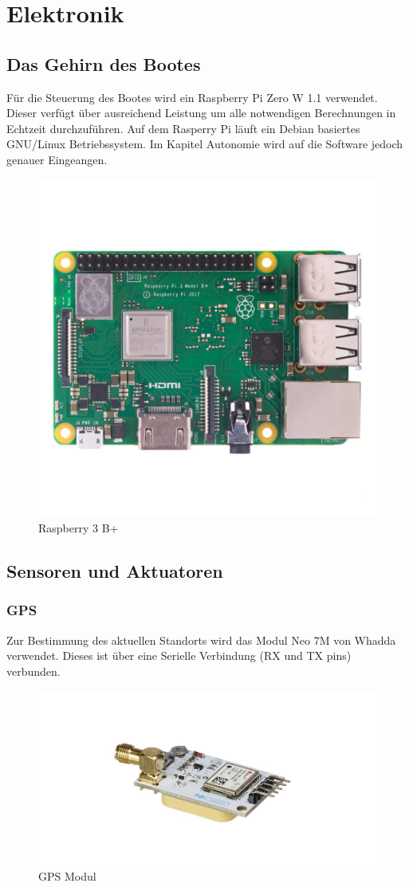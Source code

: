 

\chapter{Elektronik}
\label{chap:elektronik}

\section{Das Gehirn des Bootes}
Für die Steuerung des Bootes wird ein Raspberry Pi Zero W 1.1 verwendet. Dieser verfügt über ausreichend Leistung um alle notwendigen Berechnungen in Echtzeit durchzuführen. Auf dem Rasperry Pi läuft ein Debian basiertes GNU/Linux Betriebssystem. Im Kapitel Autonomie wird auf die Software jedoch genauer Eingeangen.

\begin{figure}[H] 
  \centering
    \includegraphics[width=0.5\linewidth]{PI_3B-plus-1-0.jpg}
    \caption{Raspberry 3 B+}
    \label{fig:rp3b+}
\end{figure}




\section{Sensoren und Aktuatoren}
\subsection{GPS}
Zur Bestimmung des aktuellen Standorts wird das Modul Neo 7M von Whadda verwendet. Dieses ist über eine Serielle Verbindung (RX und TX pins) verbunden.
\begin{figure}[H] 
    \centering
    \includegraphics[width=0.5\linewidth]{gps.png}
    \caption{GPS Modul}
    \label{fig:gps}
\end{figure}

